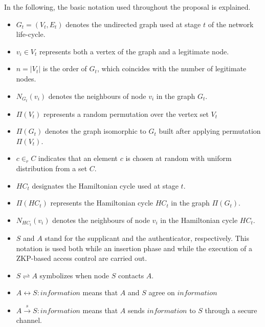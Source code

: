 \documentclass{article}
\begin{document}
In the following, the basic notation used throughout the proposal is explained.

\begin{itemize}
\item $G_t=(V_t,E_t)$ denotes the undirected graph used at stage $t$ of the network
life-cycle.

\item  $v_i \in V_t$ represents both a vertex of the graph and a legitimate node.

\item $n=\left|V_{t}\right|$ is the order of $G_t$, which coincides with the
number of legitimate nodes.

\item $N_{G_{t}}(v_i)$ denotes the neighbours of node $v_i$ in the graph $G_t$.

\item ${\Pi}(V_t)$ represents a random permutation over the
vertex set $V_t$

\item ${\Pi}(G_t)$ denotes the graph isomorphic to $G_t$ built after applying permutation ${\Pi}(V_t)$.

\item $c \in_r C$ indicates that an element $c$ is chosen at random with uniform distribution from a set $C$.

\item $HC_t$ designates the Hamiltonian cycle used at stage $t$.

\item ${\Pi}(HC_t)$ represents the Hamiltonian cycle $HC_t$ in the graph
${\Pi}(G_t)$.

\item $N_{HC_t}(v_i)$ denotes the neighbours of node $v_i$ in the Hamiltonian
cycle $HC_t$.

\item $S$ and $A$ stand for the supplicant and the
authenticator, respectively. This notation is used both while an insertion phase and while the
execution of a ZKP-based access control are carried out.

\item $S \rightleftharpoons A$ symbolizes when node $S$ contacts $A$.

\item $A \leftrightarrow S: information $  means that $ A $ and $S$ agree on $information$

\item $A \stackrel{s}{\rightarrow} S: information $  means that $ A $ sends $information$
to $S$ through a secure channel.


\end{itemize}
\end{document}
